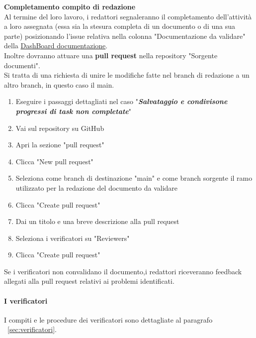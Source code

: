 \documentclass{article}
\begin{document}
\vspace{0.3cm}
     \textbf{Completamento compito di redazione}\\
    Al termine del loro lavoro, i redattori segnaleranno il completamento dell'attività a loro assegnata (essa sia la stesura completa di un documento o di una sua parte) posizionando l'issue relativa nella colonna "Documentazione da validare" della  \href{https://github.com/orgs/ByteOps-swe/projects/1/views/1}{DashBoard documentazione}.\\
    Inoltre dovranno attuare una \textbf{pull request} nella repository "Sorgente documenti".\\
    Si tratta di una richiesta di unire le modifiche fatte nel branch di redazione a un altro branch, in questo caso il main.
    \begin{enumerate}
        \item Eseguire i passaggi dettagliati nel caso "\textit{\textbf{Salvataggio e condivisone progressi di task non completate}}"
        \item Vai sul repository su GitHub
        \item Apri la sezione "pull request"
        \item Clicca "New pull request"
        \item Seleziona come branch di destinazione "main" e come branch sorgente il ramo utilizzato per la redazione del documento da validare
        \item Clicca "Create pull request"
        \item Dai un titolo e una breve descrizione alla pull request
        \item Seleziona i verificatori su "Reviewers"
        \item Clicca "Create pull request"
    \end{enumerate}
    
   Se i verificatori non convalidano il documento,i redattori riceveranno feedback allegati alla pull request relativi ai problemi identificati.
   \paragraph{I verificatori}
   I compiti e le procedure dei verificatori sono dettagliate al paragrafo ~\ref{sec:verificatori}. 
\end{document}
